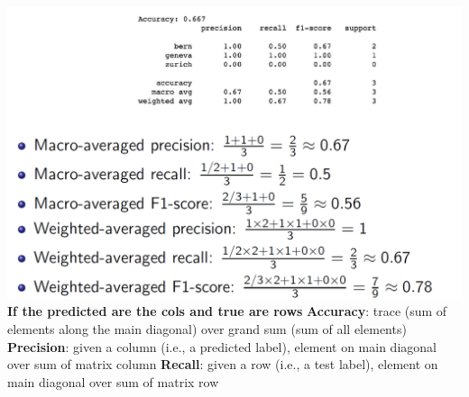 \documentclass[8pt]{extarticle}
\begin{document}
\begin{multicols*}{3}
\includegraphics[width=0.75\columnwidth]{macro_weighted.png}
\textbf{If the predicted are the cols and true are rows}
\newline \textbf{Accuracy}: trace (sum of elements along the main diagonal) over grand sum (sum of all elements)
\newline \textbf{Precision}: given a column (i.e., a predicted label), element on main diagonal over sum of matrix column
\newline \textbf{Recall}: given a row (i.e., a test label), element on main diagonal over sum of matrix row


\end{multicols*}
\end{document}
